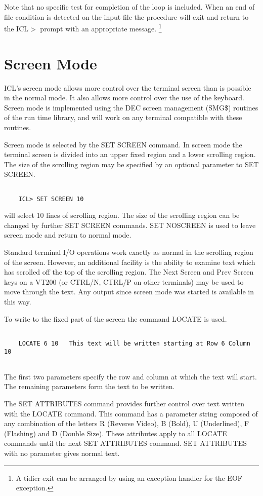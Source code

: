 Note that no specific test for completion of the loop is included. When an end
of file condition is detected on the input file the procedure will exit and
return to the ICL$>$ prompt with an appropriate message. \footnote{A tidier
exit can be arranged by using an exception handler for the EOF exception.}

\section{Screen Mode}

ICL's screen mode allows more control over the terminal screen than is possible
in the normal mode. It also allows more control over the use of the keyboard.
Screen mode is implemented using the DEC screen management (SMG\$) routines
of the run time library, and will work on any terminal compatible with these
routines.

Screen mode is selected by the SET SCREEN command. In screen mode the terminal
screen is divided into an upper fixed region and a lower scrolling region.
The size of the scrolling region may be specified by an optional parameter
to SET SCREEN.
\begin{verbatim}

    ICL> SET SCREEN 10

\end{verbatim}
will select 10 lines of scrolling region. The size of the scrolling region
can be changed by further SET SCREEN commands. SET NOSCREEN is used to leave
screen mode and return to normal mode.

Standard terminal I/O operations work exactly as normal in the scrolling
region of the screen. However, an additional facility is the ability to
examine text which has scrolled off the top of the scrolling region. The
Next Screen and Prev Screen keys on a VT200 (or CTRL/N, CTRL/P on other
terminals) may be used to move through the text. Any output since screen
mode was started is available in this way.

To write to the fixed part of the screen the command LOCATE is used.
\begin{verbatim}

    LOCATE 6 10   This text will be written starting at Row 6 Column 10
            
\end{verbatim}
The first two parameters specify the row and column at which the text will
start. The remaining parameters form the text to be written.

The SET ATTRIBUTES command provides further control over text written with
the LOCATE command. This command has a parameter string composed of any
combination of the letters R (Reverse Video), B (Bold), U (Underlined),
F (Flashing) and D (Double Size). These attributes apply to all LOCATE commands
until the next SET ATTRIBUTES command. SET ATTRIBUTES with no parameter
gives normal text.

